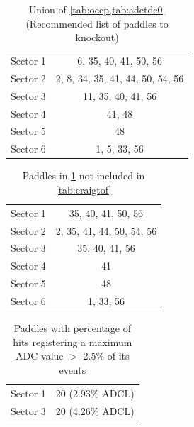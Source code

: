 \begin{table}
\centering
\begin{tabular}[!htbp]{l | c |}
Sector 1 & 6, 35, 40, 41, 50, 56\\
Sector 2 & 2, 8, 34, 35, 41, 44, 50, 54, 56\\
Sector 3 & 11, 35, 40, 41, 56\\
Sector 4 & 41, 48 \\
Sector 5 & 48\\
Sector 6 & 1, 5, 33, 56
\end{tabular}
\caption{Union of \ref{tab:occp,tab:adctdc0} (Recommended list of paddles to knockout)}
\label{tab:tofko}
\end{table}

\begin{table}
\centering
\begin{tabular}[!htbp]{l | c |}
Sector 1 & 35, 40, 41, 50, 56 \\
Sector 2 & 2, 35, 41, 44, 50, 54, 56 \\
Sector 3 & 35, 40, 41, 56 \\
Sector 4 & 41 \\
Sector 5 & 48 \\
Sector 6 & 1, 33, 56
\end{tabular}
\caption{Paddles in \ref{tab:tofko} not included in \ref{tab:craigtof}}
\label{tab:diff}
\end{table}

\begin{table}
\centering
\begin{tabular}[!htbp]{l | c |}
Sector 1 & 20 (2.93\% ADCL)\\
Sector 3 & 20 (4.26\% ADCL)
\end{tabular}
\caption{Paddles with percentage of hits registering a maximum ADC value \( > \) 2.5\% of its events}
\label{tab:adcM}
\end{table}

